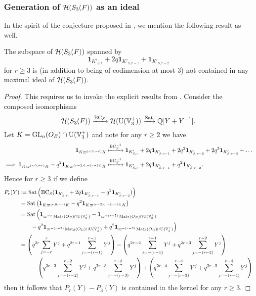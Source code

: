 \subsubsection{Generation of $\mathcal H(S_3(F))$ as an ideal}
In the spirit of the conjecture proposed in \cite[Conjecture 1.0.2]{ref:AFLspherical},
we mention the following result as well.

\begin{proposition}
  The subspace of $\mathcal H(S_3(F))$ spanned by
  \[ \mathbf{1}_{K'_{S, r}} + 2q \mathbf{1}_{K'_{S, r-1}} + \mathbf{1}_{K'_{S, r-2}} \]
  for $r \ge 3$ is (in addition to being of codimension at most $3$)
  not contained in any maximal ideal of $\mathcal H(S_3(F))$.
\end{proposition}

\begin{proof}
  This requires us to invoke the explicit results from .
  Consider the composed isomorphisms
  \[ \mathcal H(S_3(F)) \xrightarrow{\operatorname{BC}_S} \mathcal H(\operatorname{U}(\mathbb V_3^+)) \xrightarrow{\operatorname{Sat}} \mathbb Q[Y + Y^{-1}]. \]
  Let $K =  \operatorname{GL}_n(O_E) \cap \operatorname{U}(\mathbb V_3^+)$ and note for any $r \ge 2$ we have
  \begin{align*}
    \mathbf{1}_{K\varpi^{(r,0,-r)}K}
    &\xmapsto{\operatorname{BC}_S^{-1}}
    \mathbf{1}_{K'_{S, r}} + 2q \mathbf{1}_{K'_{S, r-1}} + 2q^2 \mathbf{1}_{K'_{S, r-2}} + 2q^3 \mathbf{1}_{K'_{S, r-3}} + \dots \\
    \implies
    \mathbf{1}_{K\varpi^{(r,0,-r)}K} - q^2 \mathbf{1}_{K\varpi^{(r-2,0,-(r-2))}K}
    &\xmapsto{\operatorname{BC}_S^{-1}}
    \mathbf{1}_{K'_{S, r}} + 2q \mathbf{1}_{K'_{S, r-1}} + q^2 \mathbf{1}_{K'_{S, r-2}}.
  \end{align*}
  Hence for $r \ge 3$ if we define
  \begin{align*}
    P_r(Y) &\coloneqq \operatorname{Sat}\left(\operatorname{BC}_S(\mathbf{1}_{K'_{S, r}}
      + 2q \mathbf{1}_{K'_{S, r-1}} + q^2 \mathbf{1}_{K'_{S, r-2}})\right) \\
    &= \operatorname{Sat}\left( \mathbf{1}_{K\varpi^{(r,0,-r)}K} - q^2 \mathbf{1}_{K\varpi^{(r-2,0,-(r-2))}K} \right) \\
    &= \operatorname{Sat}\Big(
      \mathbf{1}_{\varpi^{-r} \operatorname{Mat}_3(O_E) \cap \operatorname{U}(\mathbb V_3^+)}
      - \mathbf{1}_{\varpi^{-(r-1)} \operatorname{Mat}_3(O_E) \cap \operatorname{U}(\mathbb V_3^+)} \\
      &\qquad- q^2 \mathbf{1}_{\varpi^{-(r-2)} \operatorname{Mat}_3(O_E) \cap \operatorname{U}(\mathbb V_3^+)}
      + q^2 \mathbf{1}_{\varpi^{-(r-3)} \operatorname{Mat}_3(O_E) \cap \operatorname{U}(\mathbb V_3^+)}
      \Big) \\
    &= \left( q^{2r} \sum_{j=-r}^r Y^j + q^{2r-1} \sum_{j=-(r-1)}^{r-1} Y^j \right)
    - \left( q^{2r-2} \sum_{j=-(r-1)}^{r-1} Y^j + q^{2r-3} \sum_{j=-(r-2)}^{r-2} Y^j \right) \\
    &\qquad- \left( q^{2r-2} \sum_{j=-(r-2)}^{r-2} Y^j + q^{2r-3} \sum_{j=-(r-3)}^{r-3} Y^j \right)
    + \left( q^{2r-4} \sum_{j=-(r-3)}^{r-3} Y^j + q^{2r-5} \sum_{j=-(r-4)}^{r-4} Y^j \right)
  \end{align*}
  then it follows that $P_r(Y) - P_3(Y)$ is contained in the kernel for any $r \ge 3$.


\end{proof}

